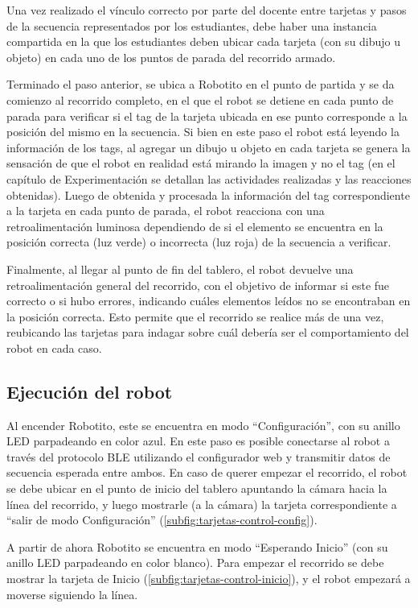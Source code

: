 \documentclass{prgrado}
\begin{document}
Una vez realizado el vínculo correcto por parte del docente entre tarjetas y pasos de la secuencia representados por los estudiantes, debe haber una instancia compartida en la que los estudiantes deben ubicar cada tarjeta (con su dibujo u objeto) en cada uno de los puntos de parada del recorrido armado.

Terminado el paso anterior, se ubica a Robotito en el punto de partida y se da comienzo al recorrido completo, en el que el robot se detiene en cada punto de parada para verificar si el tag de la tarjeta ubicada en ese punto corresponde a la posición del mismo en la secuencia. Si bien en este paso el robot está leyendo la información de los tags, al agregar un dibujo u objeto en cada tarjeta se genera la sensación de que el robot en realidad está mirando la imagen y no el tag (en el capítulo de Experimentación se detallan las actividades realizadas y las reacciones obtenidas). Luego de obtenida y procesada la información del tag correspondiente a la tarjeta en cada punto de parada, el robot reacciona con una retroalimentación luminosa dependiendo de si el elemento se encuentra en la posición correcta (luz verde) o incorrecta (luz roja) de la secuencia a verificar. 

Finalmente, al llegar al punto de fin del tablero, el robot devuelve una retroalimentación general del recorrido, con el objetivo de informar si este fue correcto o si hubo errores, indicando cuáles elementos leídos no se encontraban en la posición correcta. Esto permite que el recorrido se realice más de una vez, reubicando las tarjetas para indagar sobre cuál debería ser el comportamiento del robot en cada caso.

\subsection{Ejecución del robot}
\label{subsec:recorrido-completo}

Al encender Robotito, este se encuentra en modo ``Configuración'', con su anillo LED parpadeando en color azul. En este paso es posible conectarse al robot a través del protocolo BLE utilizando el configurador web y transmitir datos de secuencia esperada entre ambos. En caso de querer empezar el recorrido, el robot se debe ubicar en el punto de inicio del tablero apuntando la cámara hacia la línea del recorrido, y luego mostrarle (a la cámara) la tarjeta correspondiente a ``salir de modo Configuración'' (\ref{subfig:tarjetas-control-config}).

A partir de ahora Robotito se encuentra en modo ``Esperando Inicio'' (con su anillo LED parpadeando en color blanco). Para empezar el recorrido se debe mostrar la tarjeta de Inicio (\ref{subfig:tarjetas-control-inicio}), y el robot empezará a moverse siguiendo la línea. \\
\end{document}

